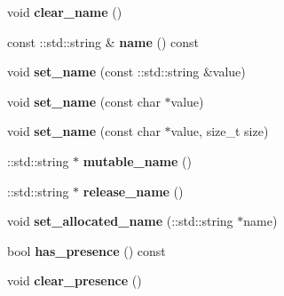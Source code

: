 \begin{DoxyCompactItemize}
\item 
\hypertarget{classSimpleChat_1_1User_a4d9132c14159dcd3484f2e66a460338d}{void {\bfseries clear\-\_\-name} ()}\label{classSimpleChat_1_1User_a4d9132c14159dcd3484f2e66a460338d}

\item 
\hypertarget{classSimpleChat_1_1User_a06790ad4fc48a7d2a4ea96bc5f577c8e}{const \-::std\-::string \& {\bfseries name} () const }\label{classSimpleChat_1_1User_a06790ad4fc48a7d2a4ea96bc5f577c8e}

\item 
\hypertarget{classSimpleChat_1_1User_aad7063635c8f76c6cb7a5d39f9968d12}{void {\bfseries set\-\_\-name} (const \-::std\-::string \&value)}\label{classSimpleChat_1_1User_aad7063635c8f76c6cb7a5d39f9968d12}

\item 
\hypertarget{classSimpleChat_1_1User_af35ec09383b0f6d08c9e7b3504e390e0}{void {\bfseries set\-\_\-name} (const char $\ast$value)}\label{classSimpleChat_1_1User_af35ec09383b0f6d08c9e7b3504e390e0}

\item 
\hypertarget{classSimpleChat_1_1User_a1359df9c2b899976cf1009decfece340}{void {\bfseries set\-\_\-name} (const char $\ast$value, size\-\_\-t size)}\label{classSimpleChat_1_1User_a1359df9c2b899976cf1009decfece340}

\item 
\hypertarget{classSimpleChat_1_1User_a0ffb1fb69382e17472fd5ce9351f43d9}{\-::std\-::string $\ast$ {\bfseries mutable\-\_\-name} ()}\label{classSimpleChat_1_1User_a0ffb1fb69382e17472fd5ce9351f43d9}

\item 
\hypertarget{classSimpleChat_1_1User_ae0bddaa2e6fface79b47b98bb44192d4}{\-::std\-::string $\ast$ {\bfseries release\-\_\-name} ()}\label{classSimpleChat_1_1User_ae0bddaa2e6fface79b47b98bb44192d4}

\item 
\hypertarget{classSimpleChat_1_1User_a9d4774e5abe7bba7e01065344cb94ab5}{void {\bfseries set\-\_\-allocated\-\_\-name} (\-::std\-::string $\ast$name)}\label{classSimpleChat_1_1User_a9d4774e5abe7bba7e01065344cb94ab5}

\item 
\hypertarget{classSimpleChat_1_1User_a3696c71b8ac996eba4e1ed2cfc5128f4}{bool {\bfseries has\-\_\-presence} () const }\label{classSimpleChat_1_1User_a3696c71b8ac996eba4e1ed2cfc5128f4}

\item 
\hypertarget{classSimpleChat_1_1User_af810ab7c99299a594cd01ea507691835}{void {\bfseries clear\-\_\-presence} ()}\label{classSimpleChat_1_1User_af810ab7c99299a594cd01ea507691835}


\end{DoxyCompactItemize}
